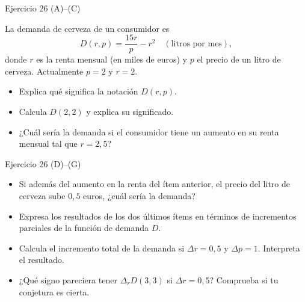 \documentclass[aspectratio=169]{beamer}
\begin{document}
\begin{frame}{Ejercicio 26 (A)–(C)}
  \begin{mwejercicio}
    La demanda de cerveza de un consumidor es
    \[
      D(r,p)=\frac{15r}{p}-r^{2}\quad(\text{litros por mes}),
    \]
    donde \(r\) es la renta mensual (en miles de euros) y \(p\) el precio de un
    litro de cerveza. Actualmente \(p=2\) y \(r=2\).
    \begin{itemize}
      \item[\textbf{(A)}] Explica qué significa la notación \(D(r,p)\).
      \item[\textbf{(B)}] Calcula \(D(2,2)\) y explica su significado.
      \item[\textbf{(C)}] ¿Cuál sería la demanda si el consumidor tiene un
      aumento en su renta mensual tal que \(r=2{,}5\)?
    \end{itemize}
  \end{mwejercicio}
\end{frame}

\begin{frame}{Ejercicio 26 (D)–(G)}
  \begin{mwejercicio}
    \begin{itemize}
      \item[\textbf{(D)}] Si además del aumento en la renta del ítem anterior,
      el precio del litro de cerveza sube \(0{,}5\) euros, ¿cuál sería la
      demanda?
      \item[\textbf{(E)}] Expresa los resultados de los dos últimos ítems en
      términos de incrementos parciales de la función de demanda \(D\).
      \item[\textbf{(F)}] Calcula el incremento total de la demanda si
      \(\Delta r=0{,}5\) y \(\Delta p=1\). Interpreta el resultado.
      \item[\textbf{(G)}] ¿Qué signo pareciera tener \(\Delta_r D(3,3)\) si
      \(\Delta r=0{,}5\)? Comprueba si tu conjetura es cierta.
    \end{itemize}
  \end{mwejercicio}
\end{frame}
\end{document}
